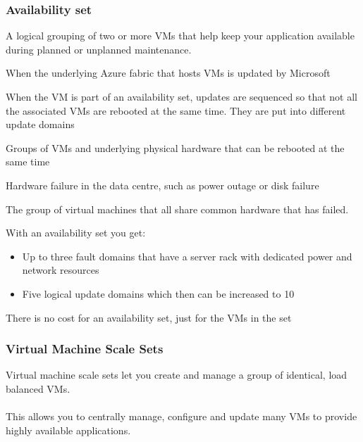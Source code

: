 \documentclass{article}[18pt]
\begin{document}
\subsubsection{Availability set}
\begin{definition}
	A logical grouping of two or more VMs that help keep your application available during planned or unplanned maintenance.
\end{definition}
\begin{definition}
	When the underlying Azure fabric that hosts VMs is updated by Microsoft
\end{definition}
When the VM is part of an availability set, updates are sequenced so that not all the associated VMs are rebooted at the same time. They are put into different update domains
\begin{definition}
	Groups of VMs and underlying physical hardware that can be rebooted at the same time
\end{definition}
\begin{definition}
	Hardware failure in the data centre, such as power outage or disk failure
\end{definition}
\begin{definition}
	The group of virtual machines that all share common hardware that has failed.
\end{definition}
With an availability set you get:
\begin{itemize}
	\item Up to three fault domains that have a server rack with dedicated power and network resources
	\item Five logical update domains which then can be increased to 10
\end{itemize}
There is no cost for an availability set, just for the VMs in the set
\subsubsection{Virtual Machine Scale Sets}
Virtual machine scale sets let you create and manage a group of identical, load balanced VMs.\\
\\
This allows you to centrally manage, configure and update many VMs to provide highly available applications.
\end{document}
